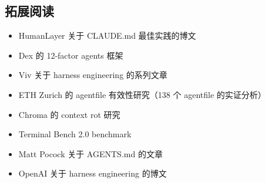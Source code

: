 \documentclass[a4paper]{article}
\begin{document}
\subsection{拓展阅读}

\begin{itemize}[leftmargin=1.5em]
    \item HumanLayer 关于 CLAUDE.md 最佳实践的博文
    \item Dex 的 12-factor agents 框架
    \item Viv 关于 harness engineering 的系列文章
    \item ETH Zurich 的 agentfile 有效性研究（138 个 agentfile 的实证分析）
    \item Chroma 的 context rot 研究
    \item Terminal Bench 2.0 benchmark
    \item Matt Pocock 关于 AGENTS.md 的文章
    \item OpenAI 关于 harness engineering 的博文
\end{itemize}

\end{document}
